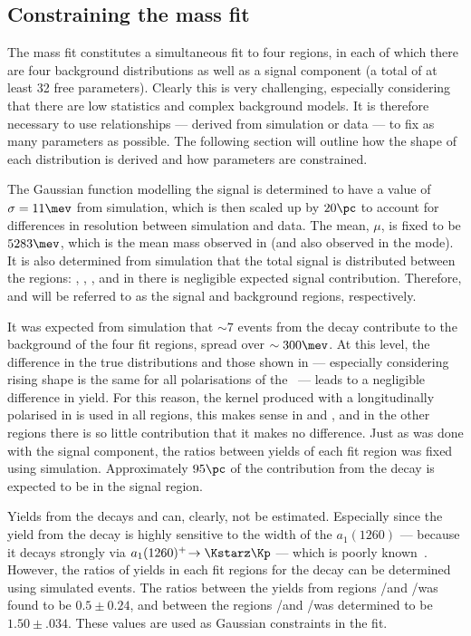 \subsection{Constraining the mass fit}
The mass fit constitutes a simultaneous fit to four regions, in each of which there are four
background distributions as well as a signal component (a total of at least 32 free parameters).
Clearly this is very challenging, especially considering that there are low statistics and complex
background models.
It is therefore necessary to use relationships --- derived from simulation or data --- to fix as
many parameters as possible.
The following section will outline how the shape of each distribution is derived and how
parameters are constrained.

The Gaussian function modelling the signal is determined to have
a value of $\sigma=11\mev$ from simulation, which is then scaled up by
$20\pc$ to account for differences in resolution between simulation and data.
The mean, $\mu$, is fixed to be $5283\mev$, which is the mean mass observed in
\decay{\Bp}{\Dz\pip} (and also observed in the \Bs mode).
It is also determined from simulation that the total signal is distributed between the regions:
\pc, \pc, \pc, and in \rD there is negligible expected signal contribution.
Therefore, \rA and \rD will be referred to as the signal and background regions,
respectively.

It was expected from simulation that $\sim7$ events from the decay \btodsstrphi contribute to the
background of the four fit regions, spread over $\sim300\mev$.
At this level, the difference in the true distributions and those shown in 
--- especially considering rising shape is the same for all polarisations of the \phii\ ---
leads to a negligible difference in yield.
For this reason, the kernel produced with a longitudinally polarised \phii in \btodsstrphi
is used in all regions, this makes sense in \rA and \rB, and in the other regions there is so
little contribution that it makes no difference.
Just as was done with the signal component, the ratios between yields of each fit region was fixed
using simulation.
Approximately $95\pc$ of the contribution from the decay \btodsstrphi is expected to be in the
signal region.

Yields from the decays \bstodskstrk and \bstodsstrkstrk can, clearly, not be estimated.
Especially since the yield from the decay \bstodskstrk is highly sensitive to the width of the
$a_1(1260)$ --- because it decays strongly via $a_1(1260)^+\!\to\Kstarz\Kp$ --- which is poorly
known~\cite{PDG2012}.
However, the ratios of yields in each fit regions for the decay \bstodskstrk can be determined
using simulated events.
The ratios between the yields from regions \rA/\rB and \rC/\rD was found to be $0.5\pm0.24$, and
between the regions \rA/\rC and \rB/\rD was determined to be $1.50\pm.034$.
These values are used as Gaussian constraints in the fit.

